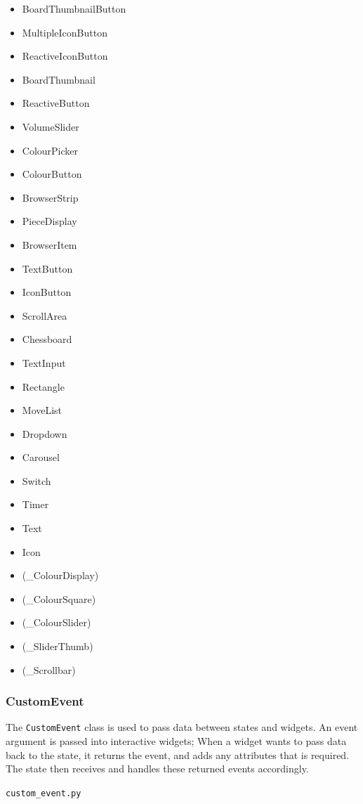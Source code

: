 \documentclass[../main/main.tex]{subfiles}
\begin{document}
\begin{multicols}{3}
\begin{itemize}
\item BoardThumbnailButton
\item MultipleIconButton
\item ReactiveIconButton
\item BoardThumbnail
\item ReactiveButton
\item VolumeSlider
\item ColourPicker
\item ColourButton
\item BrowserStrip
\item PieceDisplay
\item BrowserItem
\item TextButton
\item IconButton
\item ScrollArea
\item Chessboard
\item TextInput
\item Rectangle
\item MoveList
\item Dropdown
\item Carousel
\item Switch
\item Timer
\item Text
\item Icon
\item (\_ColourDisplay)
\item (\_ColourSquare)
\item (\_ColourSlider)
\item (\_SliderThumb)
\item (\_Scrollbar)
\end{itemize}
\end{multicols}

\subsubsection*{CustomEvent}
The \lstinline{CustomEvent} class is used to pass data between states and widgets. An event argument is passed into interactive widgets; When a widget wants to pass data back to the state, it returns the event, and adds any attributes that is required. The state then receives and handles these returned events accordingly.

\noindent\verb|custom_event.py|

\end{document}
